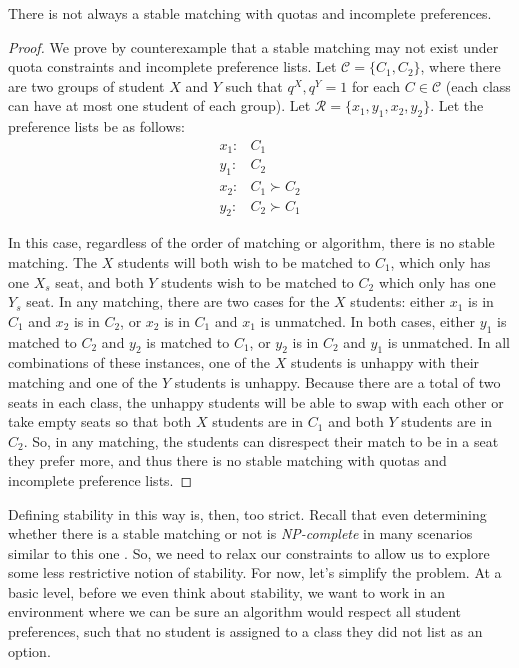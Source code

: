 \begin{theorem} \label{thm:unstable}
  There is not always a stable matching with quotas and
  incomplete preferences.
\end{theorem}

\begin{proof}
  We prove by counterexample that a stable matching may not exist under quota
  constraints and incomplete preference lists. 
  Let $\mathcal{C} = \{ C_1, C_2\}$, where there are two groups of student
  $X$ and $Y$ such that $q^X, q^Y = 1$ for each $C \in \mathcal{C}$ (each class can
  have at most one student of
  each group). Let $\mathcal{R} = \{ x_1, y_1, x_2, y_2 \}$. Let the preference lists be as
  follows: \[
    \begin{array}{ll} x_1: & C_1           \\ y_1: & C_2 \\ x_2: & C_1 \succ C_2 \\
             y_2:      & C_2 \succ C_1
    \end{array}
  \]

  In this case, regardless of the order of matching or algorithm, there is no
  stable matching. The $X$ students will both wish to be matched to $C_1$, which
  only has one $X_s$ seat, and both $Y$ students wish to be matched to $C_2$
  which only has one $Y_s$ seat. In any matching, there are two cases for the $X$
  students: either $x_1$ is in $C_1$ and $x_2$ is in $C_2$, or $x_2$ is in $C_1$
  and $x_1$ is unmatched. In both cases, either $y_1$ is matched to $C_2$ and
  $y_2$ is matched to $C_1$, or $y_2$ is in $C_2$ and $y_1$ is unmatched. In all
  combinations of these instances, one of the $X$ students is unhappy with their matching and
  one of the $Y$ students is unhappy. Because there are a total of two seats in each class,
  the unhappy students will be able to swap with each other or take empty
  seats so that both $X$ students are in $C_1$ and both $Y$ students are in
  $C_2$. So, in any matching, the students can disrespect their match to be in a
  seat they prefer more, and thus there is no stable matching with quotas and
  incomplete preference lists. 
  \end{proof}

Defining stability in this way is, then, too strict. Recall that even
determining whether there is a stable matching or not is \textit{NP-complete} in many
scenarios similar to this one \cite{santhini}. So, we need to relax our constraints
to allow us to explore some less restrictive notion of stability. For now, let’s
simplify the problem. At a basic level,
before we even think about stability, we want to work in an environment where we
can be sure an algorithm would respect all student preferences, such that no student
is assigned to a class they did not list as an option. 

